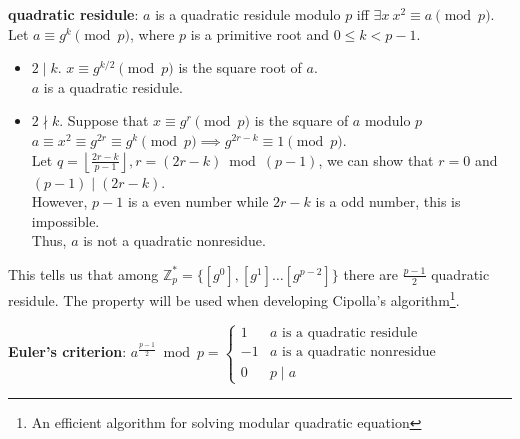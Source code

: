 \documentclass{article}
\newcommand{\ZZ}{\mathbb{Z}}
\newcommand{\floor}[1]{\left\lfloor{#1}\right\rfloor}
\begin{document}
\textbf{quadratic residule}: $a$ is a quadratic residule modulo $p$ iff $\exists x\ x^2\equiv a\pmod p$.\\

Let $a\equiv g^k\pmod p$, where $p$ is a primitive root and $0\leq k< p-1$.

\begin{itemize}
	\item $2\mid k$. $x\equiv g^{k/2}\pmod p$ is the square root of $a$.\\
		$a$ is a quadratic residule.\\
	\item $2\nmid k$. Suppose that $x\equiv g^r\pmod p$ is the square of $a$ modulo $p$\\
		$a\equiv x^2\equiv g^{2r}\equiv g^{k}\pmod p\implies g^{2r-k}\equiv 1\pmod p$.\\
		Let $q=\floor{\frac{2r-k}{p-1}},r=(2r-k)\bmod {(p-1)}$, we can show that $r=0$ and $(p-1)\mid (2r-k)$.\\
		However, $p-1$ is a even number while $2r-k$ is a odd number, this is impossible.\\
		Thus, $a$ is not a quadratic nonresidue.
\end{itemize}


This tells us that among $\ZZ_p^\ast=\{[g^0],[g^1]\ldots [g^{p-2}]\}$ there are $\frac{p-1}{2}$ quadratic residule. 
The property will be used when developing Cipolla's algorithm\footnote{An efficient algorithm for solving modular quadratic equation}.

\textbf{Euler's criterion}: $a^{\frac{p-1}{2}}\bmod p=\begin{cases}1 & a \text{ is a quadratic residule}\\ -1& a\text{ is a quadratic nonresidue}\\ 0 & p\mid a\end{cases}$
\end{document}
